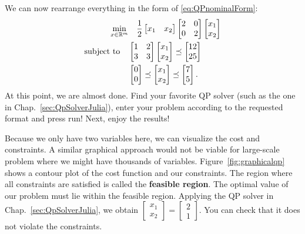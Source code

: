 We can now rearrange everything in the form of \eqref{eq:QPnominalForm}:
\begin{align*}
    \min_{x \in \mathbb R^m} & \quad \frac{1}{2} \begin{bmatrix} x_1 & x_2 \end{bmatrix} \begin{bmatrix} 2 & 0 \\ 0 & 2 \end{bmatrix} \begin{bmatrix} x_1 \\ x_2 \end{bmatrix} \\
        \text{subject to} \quad & \begin{bmatrix} 1 & 2 \\ 3 & 3 \end{bmatrix} \begin{bmatrix} x_1 \\ x_2 \end{bmatrix} \preceq \begin{bmatrix} 12 \\ 25 \end{bmatrix} \\
            & \begin{bmatrix} 0 \\ 0 \end{bmatrix} \preceq \begin{bmatrix} x_1 \\ x_2 \end{bmatrix} \preceq \begin{bmatrix} 7 \\ 5 \end{bmatrix} .
\end{align*}
At this point, we are almost done. Find your favorite QP solver (such as the one in Chap.~\ref{sec:QpSolverJulia}), enter your problem according to the requested format and press run! Next, enjoy the results!

Because we only have two variables here, we can visualize the cost and constraints. A similar graphical approach would not be viable for large-scale problem where we might have thousands of variables. Figure~\ref{fig:graphicalqp} shows a contour plot of the cost function and our constraints. The region where all constraints are satisfied is called the \textbf{feasible region}. The optimal value of our problem must lie within the feasible region. Applying the QP solver in Chap.~\ref{sec:QpSolverJulia}, we obtain $\begin{bmatrix} x_1 \\ x_2 \end{bmatrix} = \begin{bmatrix} 2 \\ 1 \end{bmatrix}$. You can check that it does not violate the constraints.
\Qed



